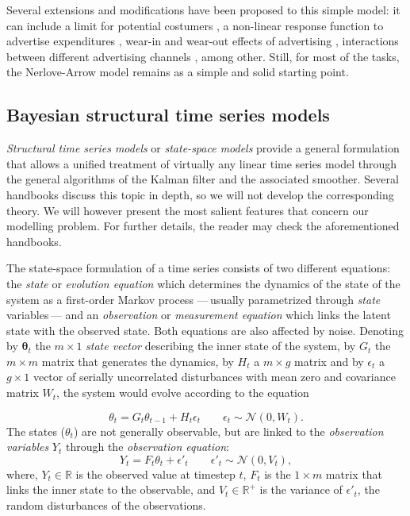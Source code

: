 Several extensions and modifications have been proposed to this simple model: it can include a limit for potential costumers \cite{vidale1957operations}, a non-linear response function to advertise expenditures \cite{little1975brandaid}, wear-in and wear-out effects of advertising \cite{naik1998planning},  interactions between different advertising channels \cite{bass2007wearout}, among other. Still, for most of the tasks, the  Nerlove-Arrow model remains as a simple and solid starting point. 

\subsection{Bayesian structural time series models}


\emph{Structural time series models} or \emph{state-space models} provide a general formulation that  allows a unified treatment of virtually any linear time series model through the general algorithms of the Kalman filter and the associated smoother. Several handbooks \cite{durbin2012time, petris2009dynamic, sarkka2013bayesian, west1998bayesian} discuss this topic in depth, so  we will not develop the corresponding theory. We will however present the most salient features that concern our modelling problem. For further details, the reader may check the aforementioned handbooks. 

The state-space formulation of a time series consists of two different equations: the \emph{state} or \emph{evolution equation} which determines the dynamics of the state of the system as a first-order Markov process ---\,usually parametrized through \emph{state} variables\,--- and an \emph{observation} or \emph{measurement  equation} which links the latent state with the observed state. Both equations are also affected by noise. Denoting by $\mathbf{\theta}_t$ the $m\times1$ \emph{state vector} describing the inner state of the system, by $G_t$ the $m\times m$ matrix that generates the dynamics, by $H_t$ a $m\times g$ matrix and by $ \epsilon_t $ a $g\times 1$ vector of serially uncorrelated disturbances with mean zero and covariance matrix $W_t$, the system would evolve according to the equation

\begin{equation}\label{eq:st}
\theta_{t} = G_t \theta_{t-1} + H_t \epsilon_t \qquad \epsilon_t \sim \mathcal{N}(0, W_t).
\end{equation}
The states ($\theta_t$) are not generally observable, but are linked to the \emph{observation variables} $Y_t$ through the \emph{observation equation}:
\begin{equation}\label{eq:obs}
Y_t = F_t \theta_t + \epsilon'_t \qquad \epsilon'_t \sim \mathcal{N}(0, V_t),
\end{equation}
where, $Y_t \in \mathbb{R}$ is the observed value at timestep $t$, $F_t$ is the $1\times m$ matrix that links the inner state to the observable, and $V_t \in \mathbb{R}^+$ is the variance of $\epsilon'_t $, the random disturbances of the observations.

